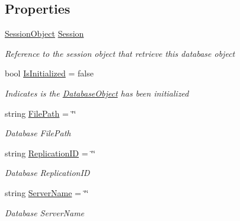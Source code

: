 \subsection*{Properties}
\begin{DoxyCompactItemize}
\item 
\mbox{\hyperlink{class_session_object}{Session\+Object}} \mbox{\hyperlink{class_database_object_aa8484162b7d2a7c4c9426bca13c64c07}{Session}}
\begin{DoxyCompactList}\small\item\em Reference to the session object that retrieve this database object \end{DoxyCompactList}\item 
bool \mbox{\hyperlink{class_database_object_a5fe036d32a30eb10d1b3f6a30263f740}{Is\+Initialized}} = false
\begin{DoxyCompactList}\small\item\em Indicates is the \mbox{\hyperlink{class_database_object}{Database\+Object}} has been initialized \end{DoxyCompactList}\item 
string \mbox{\hyperlink{class_database_object_a38a1a78430c6cd1fc4eef054e39145ce}{File\+Path}} = \char`\"{}\char`\"{}
\begin{DoxyCompactList}\small\item\em Database File\+Path \end{DoxyCompactList}\item 
string \mbox{\hyperlink{class_database_object_aaa091ee1a9a86d2d10fe2381ee2d1f4c}{Replication\+ID}} = \char`\"{}\char`\"{}
\begin{DoxyCompactList}\small\item\em Database Replication\+ID \end{DoxyCompactList}\item 
string \mbox{\hyperlink{class_database_object_ad6bfcd30152f7a115ac5a1c7fbfa9fcb}{Server\+Name}} = \char`\"{}\char`\"{}
\begin{DoxyCompactList}\small\item\em Database Server\+Name \end{DoxyCompactList}\item 

\end{DoxyCompactItemize}
